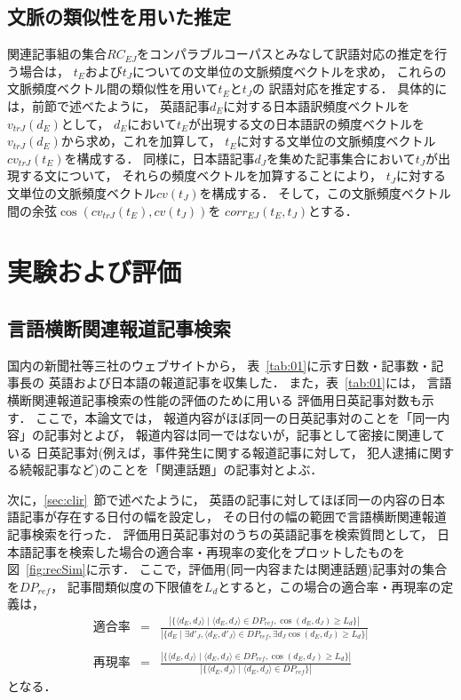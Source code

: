 \subsection{文脈の類似性を用いた推定}
\label{subsec:estm-cv}

関連記事組の集合$RC_{EJ}$をコンパラブルコーパスとみなして訳語対応の推定を行う場合は，
$t_E$および$t_J$についての文単位の文脈頻度ベクトルを求め，
これらの文脈頻度ベクトル間の類似性を用いて$t_E$と$t_J$の
訳語対応を推定する．
具体的には，前節で述べたように，
英語記事$d_E$に対する日本語訳頻度ベクトルを$v_{trJ}(d_E)$として，
$d_E$において$t_E$が出現する文の日本語訳の頻度ベクトルを
$v_{trJ}(d_E)$から求め，これを加算して，
$t_E$に対する文単位の文脈頻度ベクトル$cv_{trJ}(t_E)$を構成する．
同様に，日本語記事$d_J$を集めた記事集合において$t_J$が出現する文について，
それらの頻度ベクトルを加算することにより，
$t_J$に対する文単位の文脈頻度ベクトル$cv(t_J)$を構成する．
そして，この文脈頻度ベクトル間の余弦$\cos(cv_{trJ}(t_E),cv(t_J))$を
$corr_{EJ}(t_E,t_J)$とする．

\section{実験および評価}
\label{sec:eval}

\subsection{言語横断関連報道記事検索}
\label{subsec:expr_sb}

国内の新聞社等三社のウェブサイトから，
表~\ref{tab:01}に示す日数・記事数・記事長の
英語および日本語の報道記事を収集した．
また，表~\ref{tab:01}には，
言語横断関連報道記事検索の性能の評価のために用いる
評価用日英記事対数も示す．
ここで，本論文では，
報道内容がほぼ同一の日英記事対のことを「同一内容」の記事対とよび，
報道内容は同一ではないが，記事として密接に関連している
日英記事対(例えば，事件発生に関する報道記事に対して，
犯人逮捕に関する続報記事など)のことを「関連話題」の記事対とよぶ．

次に，\ref{sec:clir}~節で述べたように，
英語の記事に対してほぼ同一の内容の日本語記事が存在する日付の幅を設定し，
その日付の幅の範囲で言語横断関連報道記事検索を行った．
評価用日英記事対のうちの英語記事を検索質問として，
日本語記事を検索した場合の適合率・再現率の変化をプロットしたものを
図~\ref{fig:recSim}に示す．
ここで，評価用(同一内容または関連話題)記事対の集合を$DP_{ref}$，
記事間類似度の下限値を$L_d$とすると，この場合の適合率・再現率の定義は，
{
\begin{eqnarray*}
 適合率 & = & \frac{|\{\langle d_E,d_J\rangle\mid \langle d_E,d_J\rangle\in DP_{ref}, \cos(d_E,d_J)\geq L_d\}|}
              {|\{d_E\mid \exists d'_J, \langle d_E,d'_J\rangle\in DP_{ref}, \exists d_J \cos(d_E,d_J)\geq L_d\}|}
\\
& & \\
 再現率 & = & \frac{|\{\langle d_E,d_J\rangle\mid \langle d_E,d_J\rangle\in DP_{ref}, \cos(d_E,d_J)\geq L_d\}|}
              {|\{\langle d_E,d_J\rangle\mid \langle d_E,d_J\rangle\in DP_{ref}\}|}
\end{eqnarray*}
}
となる．

